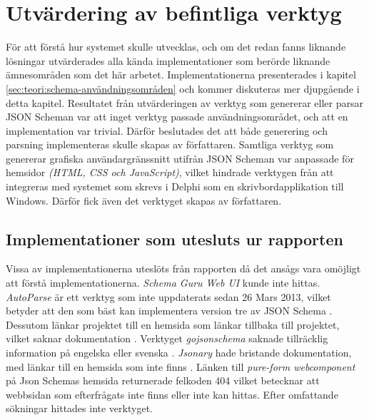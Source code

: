 \chapter{Utvärdering av befintliga verktyg}
\label{sec:forarbete}
För att förstå hur systemet skulle utvecklas, och om det redan fanns liknande lösningar utvärderades alla kända implementationer som berörde liknande ämnesområden som det här arbetet. Implementationerna presenterades i kapitel \ref{sec:teori:schema-användningsområden} och kommer diskuteras mer djupgående i detta kapitel. Resultatet från utvärderingen av verktyg som genererar eller parsar JSON Scheman var att inget verktyg passade användningsområdet, och att en implementation var trivial. Därför beslutades det att både generering och parsning implementeras skulle skapas av författaren. Samtliga verktyg som genererar grafiska användargränssnitt utifrån JSON Scheman var anpassade för hemsidor \textit{(HTML, CSS och JavaScript)}, vilket hindrade verktygen från att integreras med systemet som skrevs i Delphi som en skrivbordapplikation till Windows. Därför fick även det verktyget skapas av författaren.

\section{Implementationer som utesluts ur rapporten}
Vissa av implementationerna uteslöts från rapporten då det ansågs vara omöjligt att förstå implementationerna. \textit{Schema Guru Web UI} kunde inte hittas. \textit{AutoParse} är ett verktyg som inte uppdaterats sedan 26 Mars 2013, vilket betyder att den som bäst kan implementera version tre av JSON Schema \cite{Googleb}. Dessutom länkar projektet till en hemsida som länkar tillbaka till projektet, vilket saknar dokumentation \cite{Googleb}. Verktyget \textit{gojsonschema} saknade tillräcklig information på engelska eller svenska \cite{Zhangtao}. \textit{Jsonary} hade bristande dokumentation, med länkar till en hemsida som inte finns \cite{Jsonary-js}. Länken till \textit{pure-form webcomponent} på Json Schemas hemsida returnerade felkoden 404 vilket betecknar att webbsidan som efterfrågats inte finns eller inte kan hittas. Efter omfattande sökningar hittades inte verktyget.

